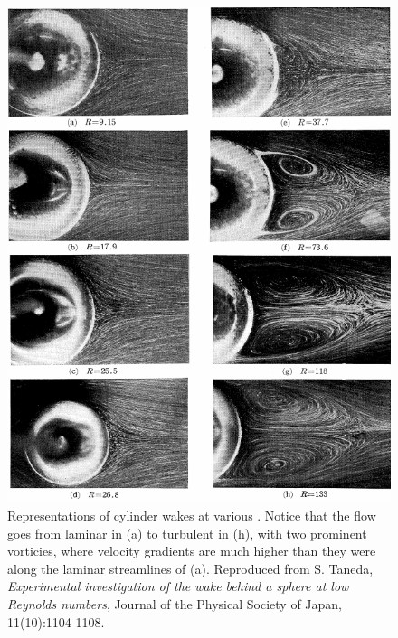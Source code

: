 \begin{figure}[h]
\centerline{
\includegraphics[scale=0.4]{Figs/ReCylinder}}
\caption{Representations of cylinder wakes at various \ReN. Notice that the flow goes from laminar in (a) to turbulent in (h), with two prominent vorticies, where velocity gradients are much higher than they were along the laminar streamlines of (a). Reproduced from S. Taneda, \emph{Experimental investigation of the wake behind a sphere at low Reynolds numbers}, Journal of the Physical Society of Japan,  11(10):1104-1108.}\label{fig:cylinderWake}
\end{figure}
